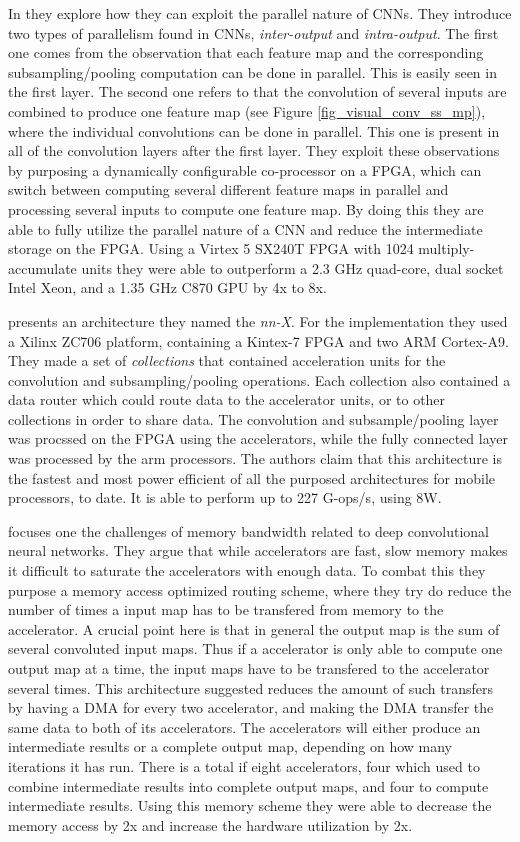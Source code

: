 In \cite{Chakradhar2010} they explore how they can exploit  the parallel nature of CNNs. They introduce two types of parallelism found in CNNs, \textit{inter-output} and \textit{intra-output}. The first one comes from the observation that each feature map and the corresponding subsampling/pooling computation can be done in parallel. This is easily seen in the first layer. The second one refers to that the convolution of several inputs are combined to produce one feature map (see Figure \ref{fig_visual_conv_ss_mp}), where the individual convolutions can be done in parallel. This one is present in all of the convolution layers after the first layer. They exploit these observations by purposing a dynamically configurable co-processor on a FPGA, which can switch between computing several different feature maps in parallel and processing several inputs to compute one feature map. By doing this they are able to fully utilize the parallel nature of a CNN and reduce the intermediate storage on the FPGA. Using a Virtex 5 SX240T FPGA with 1024 multiply-accumulate units they were able to outperform  a 2.3 GHz quad-core, dual socket Intel Xeon, and a 1.35 GHz C870 GPU by 4x to 8x. 

\cite{Paper} presents an architecture they named the \textit{nn-X}. For the implementation they used a Xilinx ZC706 platform, containing a Kintex-7 FPGA and two ARM Cortex-A9. They made a set of \textit{collections} that contained acceleration units for the convolution and subsampling/pooling operations. Each collection also contained a data router which could route data to the accelerator units, or to other collections in order to share data. The convolution and subsample/pooling layer was procssed on the FPGA using the accelerators, while the fully connected layer was processed by the arm processors. The authors claim that this architecture is the fastest and most power efficient of all the purposed architectures for mobile processors, to date. It is able to perform up to 227 G-ops/s, using 8W.  

\cite{Dundar2014} focuses one the challenges of memory bandwidth related to deep convolutional neural networks. They argue that while accelerators are fast, slow memory makes it difficult to saturate the accelerators with enough data. To combat this they purpose a memory access optimized routing scheme, where they try do reduce the number of times a input map has to be transfered from memory to the accelerator. A crucial point here is that in general the output map is the sum of several convoluted input maps. Thus if a accelerator is only able to compute one output map at a time, the input maps have to be transfered to the accelerator several times. This architecture suggested reduces the amount of such transfers by having a DMA for every two accelerator, and making the DMA transfer the same data to both of its accelerators. The accelerators will either produce an intermediate results or a complete output map, depending on how many iterations it has run. There is a total if eight accelerators, four which used to combine intermediate results into complete output maps, and four to compute intermediate results. Using this memory scheme they were able to decrease the memory access by 2x and increase the hardware utilization by 2x. 

